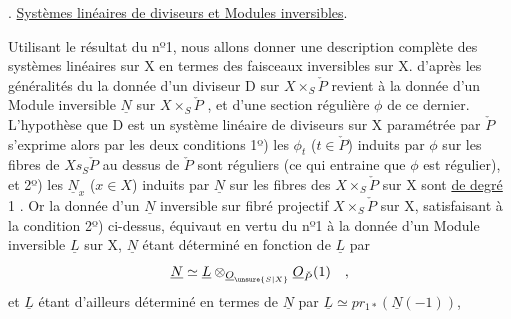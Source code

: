 
. \uline{Systèmes linéaires de diviseurs et Modules inversibles}.

Utilisant le résultat du nº1, nous allons donner une description
complète des systèmes linéaires sur X en termes des faisceaux inversibles
sur X.   d'après les généralités du  la donnée d'un
diviseur  D sur $X\times_S\check{P}$  revient à la
donnée d'un Module inversible $\underline{N}$ sur $X\times_S\check{P}$ , et d'une section régulière
$\phi$ de ce dernier.  L'hypothèse que D est un système linéaire de
diviseurs sur X paramétrée par $\check{P}$ s'exprime alors par les deux conditions
1º) les $\phi_t$ ($t\in\check{P}$) induits par $\phi$ sur les fibres de $Xs_S\check{P}$ au dessus de $\check{P}$
sont réguliers (ce qui entraine que $\phi$ est régulier), et 2º) les $\underline{N}_x$ ($x\in X$)
induits par $\underline{N}$  sur les fibres des $X\times_S\check{P}$ sur X sont \uline{de degré} 1 .
Or la donnée d'un $\underline{N}$ inversible sur  fibré projectif $X\times_S\check{P}$ sur X,
satisfaisant à la condition 2º) ci-dessus, équivaut en vertu du nº1
à la donnée d'un Module inversible $\underline{L}$ sur X, $\underline{N}$ étant déterminé en fonction
de $\underline{L}$ par
\[ \underline{N}\simeq\underline{L}\otimes_{\underline{O}_{\unsure{S|X}}}\underline{O}_{\check{P}}(1) \quad , \]
et $\underline{L}$ étant d'ailleurs déterminé en termes de $\underline{N}$ par $\underline{L}\simeq pr_{1*}(\underline{N}(-1))$,
